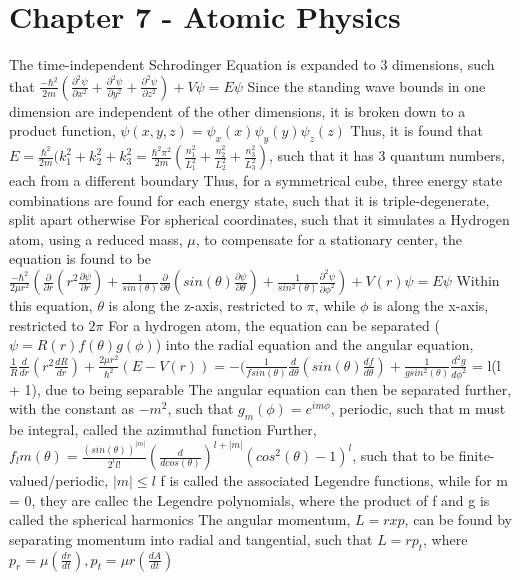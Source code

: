 \documentclass[11 pt, twoside]{article}
\newenvironment{outline*}
{
	\begin{outline}[enumerate]
	}
	{\end{outline}
}
\begin{document}
\section{Chapter 7 - Atomic Physics}
\begin{outline*}
\1 The time-independent Schrodinger Equation is expanded to 3 dimensions, such that $\frac{-\hbar^2}{2m}(\frac{\partial^2 \psi}{\partial x^2} + \frac{\partial^2 \psi}{\partial y^2} + \frac{\partial^2 \psi}{\partial z^2}) + V\psi = E\psi$
	\2 Since the standing wave bounds in one dimension are independent of the other dimensions, it is broken down to a product function, $\psi(x, y, z) = \psi_x(x)\psi_y(y)\psi_z(z)$
		\3 Thus, it is found that $E = \frac{\hbar^2}{2m}(k_1^2 + k_2^2 + k_3^2 = \frac{\hbar^2\pi^2}{2m}(\frac{n_1^2}{L_1^2} + \frac{n_2^2}{L_2^2} + \frac{n_3^2}{L_3^2})$, such that it has 3 quantum numbers, each from a different boundary
	\2 Thus, for a symmetrical cube, three energy state combinations are found for each energy state, such that it is triple-degenerate, split apart otherwise
	\2 For spherical coordinates, such that it simulates a Hydrogen atom, using a reduced mass, $\mu$, to compensate for a stationary center, the equation is found to be $\frac{-\hbar^2}{2\mu r^2}(\frac{\partial}{\partial r}(r^2 \frac{\partial \psi}{\partial r}) + \frac{1}{sin(\theta)}\frac{\partial}{\partial \theta}(sin(\theta)\frac{\partial \psi}{\partial \theta}) + \frac{1}{sin^2(\theta)}\frac{\partial^2 \psi}{\partial \phi^2}) + V(r)\psi = E\psi$
		\3 Within this equation, $\theta$ is along the z-axis, restricted to $\pi$, while $\phi$ is along the x-axis, restricted to $2\pi$
\1 For a hydrogen atom, the equation can be separated ($\psi = R(r)f(\theta)g(\phi)$) into the radial equation and the angular equation, $\frac{1}{R}\frac{d}{dr}(r^2\frac{dR}{dr}) + \frac{2\mu r^2}{\hbar^2}(E - V(r)) = -(\frac{1}{fsin(\theta)}\frac{d}{d\theta}(sin(\theta)\frac{df}{d\theta}) + \frac{1}{gsin^2(\theta)}\frac{d^2g}{d\phi^2}$ = l(l + 1), due to being separable
	\2 The angular equation can then be separated further, with the constant as $-m^2$, such that $g_m(\phi) = e^{im\phi}$, periodic, such that m must be integral, called the azimuthal function
	\2 Further, $f_lm(\theta) = \frac{(sin(\theta))^{|m|}}{2^ll!}(\frac{d}{dcos(\theta)})^{l + |m|}(cos^2(\theta) - 1)^l$, such that to be finite-valued/periodic, $|m| \leq l$
		\3 f is called the associated Legendre functions, while for m = 0, they are callec the Legendre polynomials, where the product of f and g is called the spherical harmonics
	\2 The angular momentum, $L = r x p$, can be found by separating momentum into radial and tangential, such that $L = rp_t$, where $p_r = \mu(\frac{dr}{dt}), p_t = \mu r(\frac{dA}{dt})$

\end{outline*}
\end{document}
